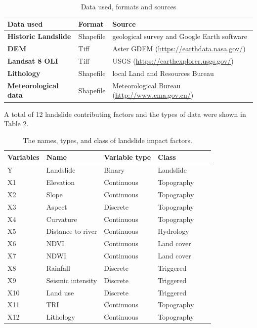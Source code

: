 \documentclass[a4paper,fleqn]{cas-sc}
\begin{document}
\begin{table}
  \caption{Data used, formats and sources}
  \begin{tabular}{lll}
    \toprule
    {\textbf{Data used}} & \textbf{Format} & \textbf{Source}\\
    \midrule
    \textbf{Historic Landslide} & Shapefile & geological survey and Google Earth software\\
    \textbf{DEM} & Tiff & Aster GDEM (\url{https://earthdata.nasa.gov/})\\
    \textbf{Landsat 8 OLI} & Tiff & USGS (\url{https://earthexplorer.usgs.gov/})\\
    \textbf{Lithology} & Shapefile & local Land and Resources Bureau\\
    \textbf{Meteorological data} & Shapefile & Meteorological Bureau (\url{http://www.cma.gov.cn/})\\
    \bottomrule
  \end{tabular}
  \label{tab_datasource}
\end{table}

A total of 12 landslide contributing factors and the types of data were shown in Table \ref{tab_factors}. 

\begin{table}
  \centering
  \caption{The names, types, and class of landslide impact factors.} 
  \begin{tabular}{llllll}
    \toprule
    \textbf{Variables} & \textbf{Name}  & \textbf{Variable type} & \textbf{Class} \\
    \midrule
    Y     & Landslide  & Binary & Landslide \\
    X1    & Elevation  & Continuous & Topography \\
    X2    & Slope  & Continuous & Topography \\
    X3    & Aspect  & Discrete & Topography \\
    X4   & Curvature  & Continuous & Topography \\
    X5   & Distance to river  & Continuous  & Hydrology \\
    X6   & NDVI   & Continuous & Land cover  \\
    X7   & NDWI   & Continuous & Land cover \\
    X8   & Rainfall  & Discrete & Triggered  \\
    X9   & Seismic intensity  & Discrete & Triggered  \\
    X10   & Land use  & Discrete & Triggered  \\
    X11   & TRI  & Continuous & Topography  \\
    X12   & Lithology  & Continuous & Topography  \\
    \bottomrule
    \end{tabular}%
  \label{tab_factors}%
\end{table}%
\end{document}
